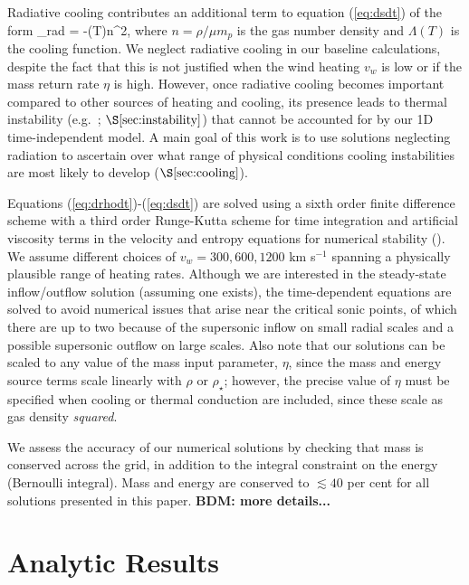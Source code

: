 \documentclass[usenatbib,fleqn]{mn2e}
\newcommand{\vwO}{v_{w}}
\begin{document}
Radiative cooling contributes an additional term to equation (\ref{eq:dsdt}) of the form
\be
{}_{\rm rad} = -\Lambda(T)n^{2},
\label{eq:qdot_rad}
\ee
where $n = \rho/\mu m_p$ is the gas number density and $\Lambda(T)$ is the cooling function.  We neglect radiative cooling in our baseline calculations, despite the fact that this is not justified when the wind heating $\vwO$ is low or if the mass return rate $\eta$ is high.  However, once radiative cooling becomes important compared to other sources of heating and cooling, its presence leads to thermal instability (e.g.~\citealt{McCourt+12}; $\S\ref{sec:instability}$) that cannot be accounted for by our 1D
time-independent model.  A main goal of this work is to use solutions neglecting radiation to ascertain over what range of physical conditions cooling instabilities are most likely to develop ($\S\ref{sec:cooling}$).

Equations (\ref{eq:drhodt})-(\ref{eq:dsdt}) are solved using a sixth
order finite difference scheme with a third order Runge-Kutta scheme
for time integration and artificial viscosity terms in the velocity
and entropy equations for numerical stability
(\citealt{Brandenburg:2003a}).  We assume different
choices of $v_{w} = 300, 600, 1200$ km s$^{-1}$ spanning a
physically plausible range of heating rates.  Although we are interested in the steady-state inflow/outflow solution (assuming one exists), the time-dependent equations are solved to avoid numerical issues that arise near the critical sonic points, of which there are up to two because of the supersonic
inflow on small radial scales and a possible supersonic outflow on large scales.  Also note that our solutions can be scaled to any value of the mass input parameter, $\eta$, since the mass and energy source terms scale linearly with $\rho$ or $\rho_{\star}$; however, the precise value of $\eta$ must be specified when cooling or thermal conduction are included, since these scale as gas density {\it squared}. 

We assess the accuracy of our numerical solutions by checking that mass is conserved across the grid, in addition to the integral constraint on the energy (Bernoulli integral).  Mass and energy are conserved to $\lesssim
40$ per cent for all solutions presented in this paper.  {\bf BDM:
  more details...}



\section{Analytic Results}
\label{sec:results}
\end{document}
